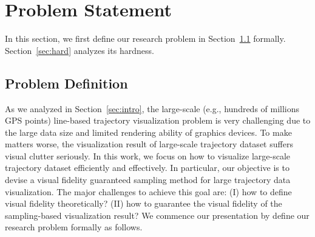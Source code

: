 \section{Problem Statement}\label{sec:pro}
In this section, we first define our research problem in Section~\ref{sec:def} formally.
Section~\ref{sec:hard} analyzes its hardness.
%


\subsection{Problem Definition}\label{sec:def}
As we analyzed in Section~\ref{sec:intro}, the large-scale (e.g., hundreds of millions GPS points) line-based trajectory visualization problem is very challenging due to the large data size and limited rendering ability of graphics devices.
To make matters worse, the visualization result of large-scale trajectory dataset suffers visual clutter seriously.
In this work, we focus on how to visualize large-scale trajectory dataset efficiently and effectively.
In particular, our objective is to devise a visual fidelity guaranteed sampling method for large trajectory data visualization.
The major challenges to achieve this goal are:
(I) how to define visual fidelity theoretically? (II) how to guarantee the visual fidelity of the sampling-based visualization result?
We commence our presentation by define our research problem formally as follows.

